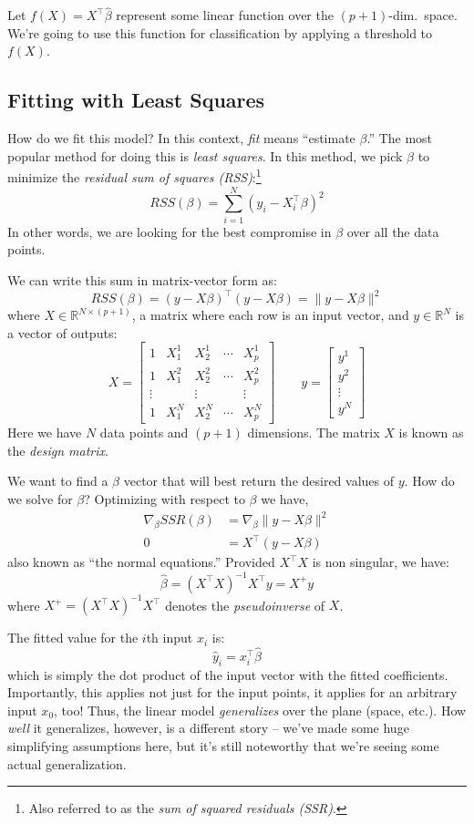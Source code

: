 \documentclass[a4paper]{article}
\begin{document}
Let $f(X)=X^\top\hat{\beta}$ represent some linear function over the $(p+1)$-dim.\ space. We're going to use this function for classification by applying a threshold to $f(X)$.

\subsection{Fitting with Least Squares}

How do we fit this model?  In this context, \emph{fit} means ``estimate $\beta$.'' The most popular method for doing this is \emph{least squares}.  In this method, we pick $\beta$ to minimize the \emph{residual sum of squares (RSS)}:\footnote{Also referred to as the \emph{sum of squared residuals (SSR)}.}
$$RSS(\beta)=\sum_{i=1}^N(y_i-X_i^\top\beta)^2$$
In other words, we are looking for the best compromise in $\beta$ over all the data points.

We can write this sum in matrix-vector form as:
$$RSS(\beta) = (y-X\beta)^\top(y-X\beta) = \|y-X\beta\|^2$$
where $X\in\mathbb{R}^{N\times (p+1)}$, a matrix where each row is an input vector, and $y\in\mathbb{R}^N$ is a vector of outputs:
$$X=\left[\begin{array}{ccccc}1&X_1^1&X_2^1&\cdots&X_p^1\\1&X_1^2&X_2^2&\cdots&X_p^2\\\vdots& &\vdots& & \vdots\\1&X_1^N&X_2^N&\cdots&X_p^N\end{array}\right] \qquad y=\left[\begin{array}{c}y^1\\y^2\\\vdots\\y^N\end{array}\right]$$
Here we have $N$ data points and $(p+1)$ dimensions. The matrix $X$ is known as the \emph{design matrix}.

We want to find a $\beta$ vector that will best return the desired values of $y$.  How do we solve for $\beta$?  Optimizing with respect to $\beta$ we have,
\begin{align*}
\nabla_\beta SSR(\beta) &= \nabla_\beta \|y-X\beta\|^2\\
0 &= X^\top(y-X\beta)
\end{align*}
also known as ``the normal equations.''  Provided $X^\top X$ is non singular, we have:
$$\hat{\beta}=(X^\top X)^{-1}X^\top y = X^+y$$
where $X^+=(X^\top X)^{-1}X^\top$ denotes the \emph{pseudoinverse} of $X$.

The fitted value for the $i$th input $x_i$ is:
$$\hat{y}_i=x_i^\top \hat{\beta}$$
which is simply the dot product of the input vector with the fitted coefficients.  Importantly, this applies not just for the input points, it applies for an arbitrary input $x_0$, too!  Thus, the linear model \emph{generalizes} over the plane (space, etc.).  How \emph{well} it generalizes, however, is a different story -- we've made some huge simplifying assumptions here, but it's still noteworthy that we're seeing some actual generalization.
\end{document}
